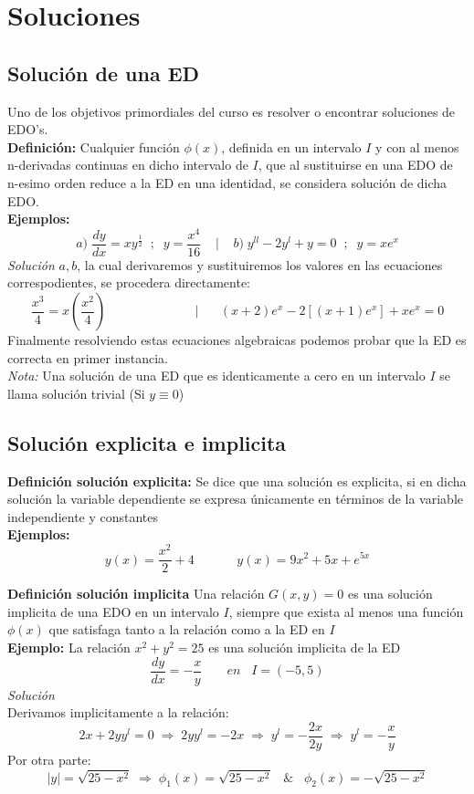 \documentclass[10pt,executivepaper]{article}
\begin{document}
\section{Soluciones}
\subsection{Solución de una ED}
Uno de los objetivos primordiales del curso es resolver o encontrar soluciones de EDO's.\\
\textbf{Definición:} Cualquier función $\phi(x)$, definida en un intervalo $I$ y con al menos n-derivadas continuas en dicho intervalo de $I$, que al sustituirse en una EDO de n-esimo orden reduce a la ED en una identidad, se considera solución de dicha EDO.
\\\textbf{Ejemplos:}
\[a)\;\frac{dy}{dx}=xy^{\frac{1}{2}}\;\;;\;\;y=\frac{x^{4}}{16}\;\;\;\;|\;\;\;\;b)\;y^{ll}-2y^{l}+y=0\;\;;\;\;y=xe^{x}\]
\textit{Solución} $a,b$, la cual derivaremos y sustituiremos los valores en las ecuaciones correspodientes, se procedera directamente:
\[\frac{x^{3}}{4}=x\left(\frac{x^{2}}{4}\right)\;\;\;\;\;\;\;\;\;\;\;\;\;\;\;\;\;\;\;\;\;\;\;\;\;|\;\;\;\;\;\;(x+2)e^{x}-2[(x+1)e^{x}]+xe^{x}=0\]
Finalmente resolviendo estas ecuaciones algebraicas podemos probar que la ED es correcta en primer instancia.\\
\textit{Nota:} Una solución de una ED que es identicamente a cero en un intervalo $I$ se llama solución trivial (Si $y\equiv0$)

\subsection{Solución explicita e implicita}
\textbf{Definición solución explicita:} Se dice que una solución es explicita, si en dicha solución la variable dependiente se expresa únicamente en términos de la variable independiente y constantes
\\\textbf{Ejemplos:}
\[y(x)=\frac{x^{2}}{2}+4\;\;\;\;\;\;\;\;\;\;\;\;y(x)=9x^{2}+5x+e^{5x}\]

\textbf{Definición solución implicita} Una relación $G(x,y)=0$ es una solución implicita de una EDO en un intervalo $I$, siempre que exista al menos una función $\phi(x)$ que satisfaga tanto a la relación como  a la ED en $I$
\\\textbf{Ejemplo:}
La relación $x^{2}+y^{2}=25$ es una solución implicita de la ED
\[\frac{dy}{dx}=-\frac{x}{y}\;\;\;\;\;\;\;en\;\;\;I=(-5,5)\]
\textit{Solución}\\
Derivamos implicitamente a la relación:
\[2x+2yy^{l}=0 \;\Rightarrow\; 2yy^{l}=-2x \;\Rightarrow\; y^{l}=-\frac{2x}{2y}\;\Rightarrow\; y^{l}=-\frac{x}{y}\]
Por otra parte:
\[\left|y\right|=\sqrt{25-x^{2}}\;\Rightarrow\;\phi_{1}(x)=\sqrt{25-x^{2}}\;\;\;\&\;\;\;\phi_{2}(x)=-\sqrt{25-x^{2}}\]
\clearpage
\end{document}
